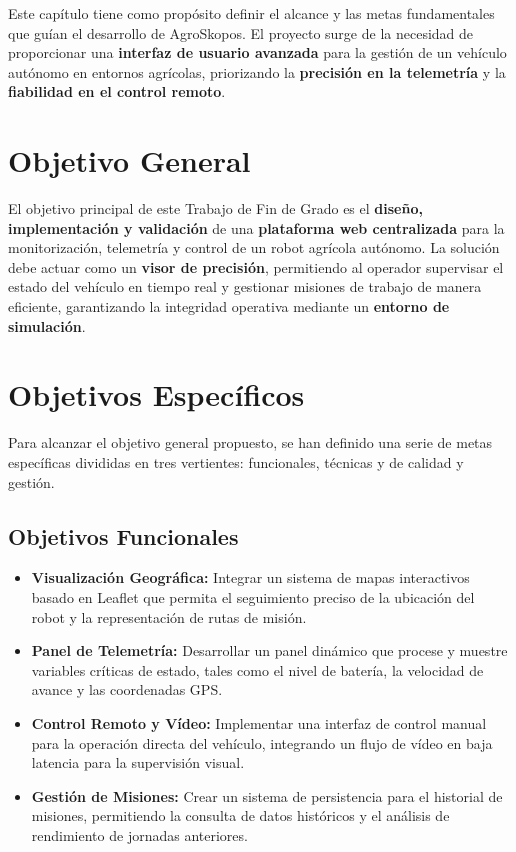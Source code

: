 
Este capítulo tiene como propósito definir el alcance y las metas fundamentales que guían el desarrollo de AgroSkopos. El proyecto surge de la necesidad de proporcionar una \textbf{interfaz de usuario avanzada} para la gestión de un vehículo autónomo en entornos agrícolas, priorizando la \textbf{precisión en la telemetría} y la \textbf{fiabilidad en el control remoto}.

\section{Objetivo General}

El objetivo principal de este Trabajo de Fin de Grado es el \textbf{diseño, implementación y validación} de una \textbf{plataforma web centralizada} para la monitorización, telemetría y control de un robot agrícola autónomo. La solución debe actuar como un \textbf{visor de precisión}, permitiendo al operador supervisar el estado del vehículo en tiempo real y gestionar misiones de trabajo de manera eficiente, garantizando la integridad operativa mediante un \textbf{entorno de simulación}.

\section{Objetivos Específicos}

Para alcanzar el objetivo general propuesto, se han definido una serie de metas específicas divididas en tres vertientes: funcionales, técnicas y de calidad y gestión.

\subsection{Objetivos Funcionales}

\begin{itemize}
    \item \textbf{Visualización Geográfica:} Integrar un sistema de mapas interactivos basado en Leaflet \cite{leaflet} que permita el seguimiento preciso de la ubicación del robot y la representación de rutas de misión.
    \item \textbf{Panel de Telemetría:} Desarrollar un panel dinámico que procese y muestre variables críticas de estado, tales como el nivel de batería, la velocidad de avance y las coordenadas GPS.
    \item \textbf{Control Remoto y Vídeo:} Implementar una interfaz de control manual para la operación directa del vehículo, integrando un flujo de vídeo en baja latencia para la supervisión visual.
    \item \textbf{Gestión de Misiones:} Crear un sistema de persistencia para el historial de misiones, permitiendo la consulta de datos históricos y el análisis de rendimiento de jornadas anteriores.
\end{itemize}

